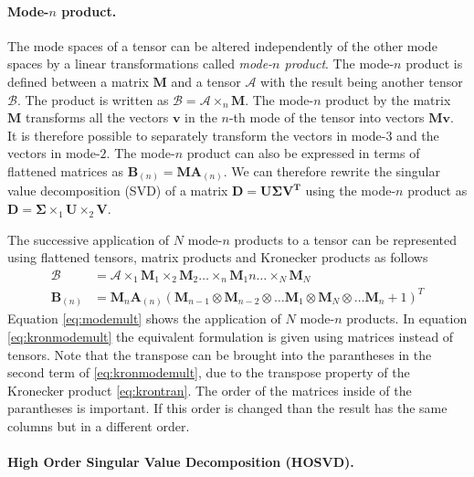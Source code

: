 \documentclass[11pt,a4paper]{report}
\begin{document}
\paragraph{Mode-$n$ product.}
The mode spaces of
a tensor can be altered independently of the other
mode spaces by a linear transformations called \textit{mode-$n$ product}. The
mode-$n$ product is defined between a matrix $\mathbf{M}$ and a tensor
$\mathcal{A}$ with the result being another tensor $\mathcal{B}$. The product is
written as $\mathcal{B} = \mathcal{A} \times_n \mathbf{M}$. The mode-$n$ product
by the matrix $\mathbf{M}$ transforms all the vectors $\mathbf{v}$ in the $n$-th mode of the tensor into vectors
$\mathbf{M}\mathbf{v}$. It is therefore possible to separately transform the vectors in
mode-$3$ and the vectors in mode-$2$. The mode-$n$ product can also be expressed in
terms of flattened matrices as $\mathbf{B}_{(n)} = \mathbf{M} \mathbf{A}_{(n)}
$. We can therefore rewrite the singular value decomposition (SVD) of a matrix $\mathbf{D
  = U\Sigma V^T}$ using the mode-$n$ product as $\mathbf{D} = \mathbf{\Sigma} \times_1
\mathbf{U} \times_2 \mathbf{V}$. 

The successive application of $N$ mode-$n$ products to a tensor can be
represented using flattened tensors, matrix products and Kronecker products as follows
\begin{align}\label{eq:modemult}
\mathcal{B} &= \mathcal{A} \times_1 \mathbf{M}_1 \times_2 \mathbf{M}_2  \ldots
\times_n \mathbf{M}_1n \ldots \times_N \mathbf{M}_N\\
\label{eq:kronmodemult}
\mathbf{B}_{(n)} &= \mathbf{M}_n \mathbf{A}_{(n)} (\mathbf{M}_{n-1} \otimes
\mathbf{M}_{n-2} \otimes \ldots \mathbf{M}_1 \otimes \mathbf{M}_N \otimes \ldots \mathbf{M}_n+1)^T 
\end{align}
Equation \ref{eq:modemult} shows the application of $N$ mode-$n$
products. In equation \ref{eq:kronmodemult} the equivalent formulation is given
using matrices instead of tensors. Note that the transpose can be brought into
the parantheses in the second term of
\ref{eq:kronmodemult}, due to the transpose property of
the Kronecker product \ref{eq:krontran}. The order of the matrices inside of the
parantheses is important. If this order is changed than the result has the
same columns but in a different order.
\paragraph{High Order Singular Value Decomposition (HOSVD).}
\end{document}

